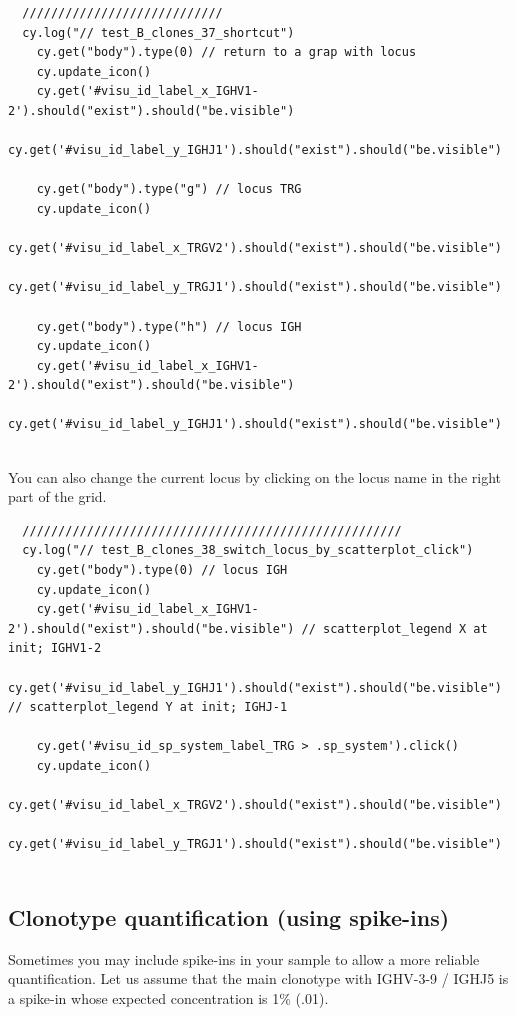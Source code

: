 \begin{verbatim}
  ////////////////////////////
  cy.log("// test_B_clones_37_shortcut")
    cy.get("body").type(0) // return to a grap with locus 
    cy.update_icon()
    cy.get('#visu_id_label_x_IGHV1-2').should("exist").should("be.visible")
    cy.get('#visu_id_label_y_IGHJ1').should("exist").should("be.visible")

    cy.get("body").type("g") // locus TRG
    cy.update_icon()
    cy.get('#visu_id_label_x_TRGV2').should("exist").should("be.visible")
    cy.get('#visu_id_label_y_TRGJ1').should("exist").should("be.visible")

    cy.get("body").type("h") // locus IGH
    cy.update_icon()
    cy.get('#visu_id_label_x_IGHV1-2').should("exist").should("be.visible")
    cy.get('#visu_id_label_y_IGHJ1').should("exist").should("be.visible")


\end{verbatim}

You can also change the current locus by clicking on the locus name in the
right part of the grid.
\begin{verbatim}
  /////////////////////////////////////////////////////
  cy.log("// test_B_clones_38_switch_locus_by_scatterplot_click")
    cy.get("body").type(0) // locus IGH
    cy.update_icon()
    cy.get('#visu_id_label_x_IGHV1-2').should("exist").should("be.visible") // scatterplot_legend X at init; IGHV1-2
    cy.get('#visu_id_label_y_IGHJ1').should("exist").should("be.visible")   // scatterplot_legend Y at init; IGHJ-1

    cy.get('#visu_id_sp_system_label_TRG > .sp_system').click()
    cy.update_icon()
    cy.get('#visu_id_label_x_TRGV2').should("exist").should("be.visible")
    cy.get('#visu_id_label_y_TRGJ1').should("exist").should("be.visible")


\end{verbatim}

\subsection{Clonotype quantification (using spike-ins)}

Sometimes you may include spike-ins in your sample to allow a more reliable
quantification.
Let us assume that the main clonotype with IGHV-3-9 / IGHJ5 is a spike-in whose
expected concentration is 1\% (.01).

